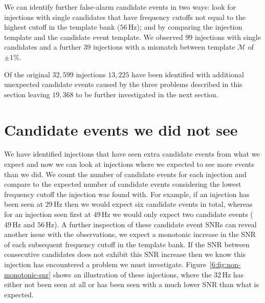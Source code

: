 We can identify further false-alarm candidate events in two ways: look for injections with single candidates that have frequency cutoffs not equal to the highest cutoff in the template bank ($56 \, \text{Hz}$); and by comparing the injection template and the candidate event template. We observed $99$ injections with single candidates and a further $39$ injections with a mismatch between template $\mathcal{M}$ of ${\pm}1\%$.

Of the original $32,599$ injections $13,225$ have been identified with additional unexpected candidate events caused by the three problems described in this section leaving $19,368$ to be further investigated in the next section.

\section{\label{6:sec:outside-coinc-window}Candidate events we did not see}


We have identified injections that have seen extra candidate events from what we expect and now we can look at injections where we expected to see more events than we did. We count the number of candidate events for each injection and compare to the expected number of candidate events considering the lowest frequency cutoff the injection was found with. For example, if an injection has been seen at $29 \, \text{Hz}$ then we would expect six candidate events in total, whereas for an injection seen first at $49 \, \text{Hz}$ we would only expect two candidate events ($49 \, \text{Hz}$ and $56 \, \text{Hz}$). A further inspection of these candidate event SNRs can reveal another issue with the observations, we expect a monotonic increase in the SNR of each subsequent frequency cutoff in the template bank. If the SNR between consecutive candidates does not exhibit this SNR increase then we know this injection has encountered a problem we must investigate. Figure~\ref{6:fig:non-monotonic-snr} shows an illustration of these injections, where the 
$32 \, \text{Hz}$ has either not been seen at all or has been seen with a much lower SNR than what is expected.


